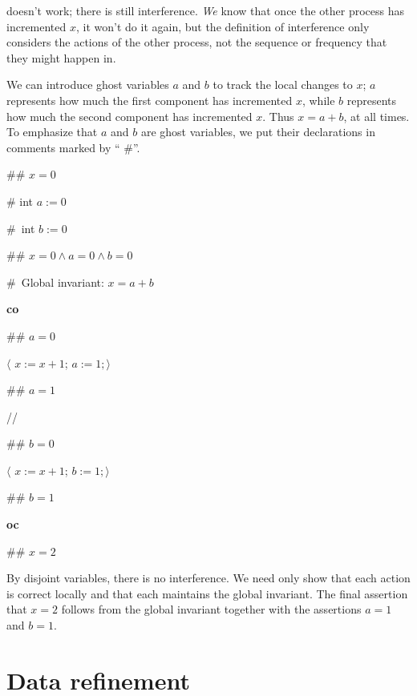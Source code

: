 \documentclass[muchmore,11pt]{article}%
\begin{document}
\noindent doesn't work; there is still interference. \emph{We} know that once
the other process has incremented $x$, it won't do it again, but the
definition of interference only considers the actions of the other process,
not the sequence or frequency that they might happen in.

We can introduce ghost variables $a$ and $b$ to track the local changes to
$x$; $a$ represents how much the first component has incremented $x$, while
$b$ represents how much the second component has incremented $x$. Thus
$x=a+b$, at all times. To emphasize that $a$ and $b$ are ghost variables, we
put their declarations in comments marked by \textquotedblleft%
\#\textquotedblright.

\begin{code}
\#\# $x=0$

\# int $a:=0$

\#\ int $b:=0$

\#\# $x=0\wedge a=0\wedge b=0$

\#\ Global invariant: $x=a+b$

\textbf{co}

\begin{indent}
\item \#\# $a=0$

\item $\langle$ $x:=x+1$; $a:=1;\rangle$

\item \#\# $a=1$
\end{indent}

//

\begin{indent}
\item \#\# $b=0$

\item $\langle$ $x:=x+1$; $b:=1;\rangle$

\item \#\# $b=1$
\end{indent}

\textbf{oc}

\#\# $x=2$
\end{code}

\noindent By disjoint variables, there is no interference. We need only show
that each action is correct locally and that each maintains the global
invariant. The final assertion that $x=2$ follows from the global invariant
together with the assertions $a=1$ and $b=1$.

\section{Data refinement\label{trans}}
\end{document}
